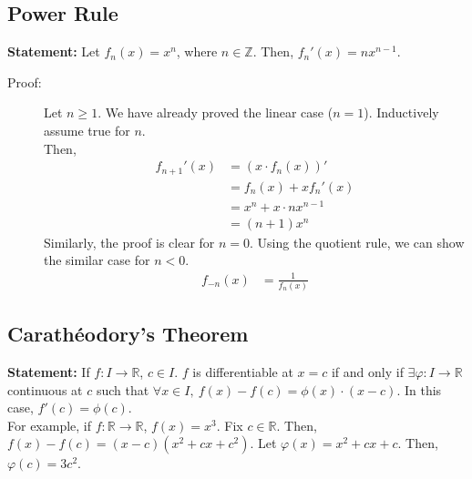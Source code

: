 \documentclass[10pt]{extarticle}
\newcommand{\Z}{\mathbb{Z}}
\newcommand{\R}{\mathbb{R}}
\begin{document}
  \subsection{Power Rule}%
   \textbf{Statement:} Let $f_n(x) = x^n$, where $n\in \Z$. Then, $f_n'(x) = nx^{n-1}$.
    \begin{description}
      \item[Proof:] Let $n\geq 1$. We have already proved the linear case ($n=1$). Inductively assume true for $n$.\\

        Then, 
        \begin{align*}
          f_{n+1}'(x) &= (x \cdot f_n(x))'\\
                      &= f_n(x) + xf_n'(x)\\
                      &= x^n + x \cdot nx^{n-1}\\
                      &= (n+1)x^{n}
        \end{align*}
        Similarly, the proof is clear for $n=0$. Using the quotient rule, we can show the similar case for $n < 0$.
        \begin{align*}
          f_{-n}(x) &= \frac{1}{f_n(x)} \tag*{$n = 1,2,3,\dots$}
        \end{align*}
    \end{description}
  \subsection{Carathéodory's Theorem}%
    \textbf{Statement:} If $f: I\rightarrow \R$, $c\in I$. $f$ is differentiable at $x=c$ if and only if $\exists \varphi: I\rightarrow \R$ continuous at $c$ such that $\forall x\in I,~f(x) - f(c) = \phi(x) \cdot (x-c)$. In this case, $f'(c) = \phi(c)$.\\

    For example, if $f: \R\rightarrow \R$, $f(x) = x^3$. Fix $c\in\R$. Then, $f(x) - f(c) = (x-c)(x^2 + cx + c^2)$. Let $\varphi(x) = x^2 + cx + c$. Then, $\varphi(c) = 3c^2$.
\end{document}
